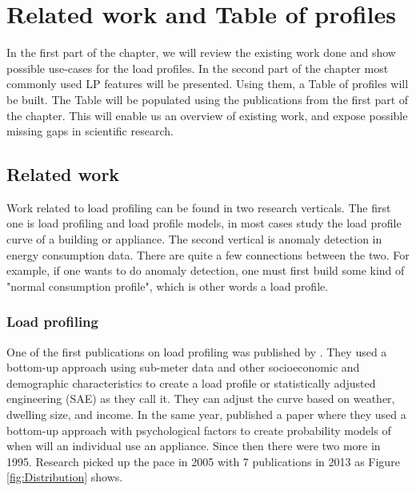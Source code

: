 \chapter{Related work and Table of profiles}
\label{chapter2}

In the first part of the chapter, we will review the existing work done and show possible use-cases for the load profiles.  
In the second part of the chapter most commonly used LP features will be presented. 
Using them, a Table of profiles will be built. 
The Table will be populated using the publications from the first part of the chapter.
This will enable us an overview of existing work, and expose possible missing gaps in scientific research.

\section{Related work}
\label{sec:related_work}
Work related to load profiling can be found in two research verticals. 
The first one is load profiling and load profile models, in most cases study the load profile curve of a building or appliance.
The second vertical is anomaly detection in energy consumption data. There are quite a few connections between the two. 
For example, if one wants to do anomaly detection, one must first build some kind of "normal consumption profile", which is other words a load profile.

\subsection{Load profiling}

One of the first publications on load profiling was published by \cite{TRAIN19851103}.
They used a bottom-up approach using sub-meter data and other socioeconomic and demographic characteristics 
to create a load profile or statistically adjusted engineering (SAE) as they call it.
They can adjust the curve based on weather, dwelling size, and income. 
In the same year, \cite{WALKER1985} published a paper where they used a bottom-up approach with psychological factors to create probability models of when will an individual use an appliance.
Since then there were two more in 1995. Research picked up the pace in 2005 with 7 publications in 2013 as Figure \ref{fig:Distribution} shows.

